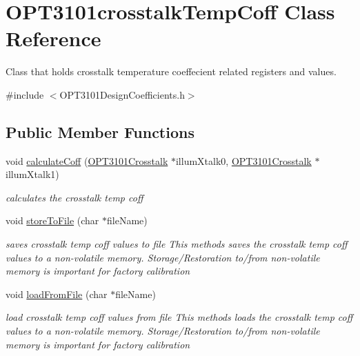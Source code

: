 \hypertarget{class_o_p_t3101crosstalk_temp_coff}{}\section{O\+P\+T3101crosstalk\+Temp\+Coff Class Reference}
\label{class_o_p_t3101crosstalk_temp_coff}


Class that holds crosstalk temperature coeffecient related registers and values.  




{\ttfamily \#include $<$O\+P\+T3101\+Design\+Coefficients.\+h$>$}

\subsection*{Public Member Functions}
\begin{DoxyCompactItemize}
\item 
void \mbox{\hyperlink{class_o_p_t3101crosstalk_temp_coff_a4a9926dea76c9744cd5bb4fd9b96fd52}{calculate\+Coff}} (\mbox{\hyperlink{class_o_p_t3101_crosstalk}{O\+P\+T3101\+Crosstalk}} $\ast$illum\+Xtalk0, \mbox{\hyperlink{class_o_p_t3101_crosstalk}{O\+P\+T3101\+Crosstalk}} $\ast$illum\+Xtalk1)
\begin{DoxyCompactList}\small\item\em calculates the crosstalk temp coff \end{DoxyCompactList}\item 
void \mbox{\hyperlink{class_o_p_t3101crosstalk_temp_coff_a8283a641699c42fe5232c2758ddfcd40}{store\+To\+File}} (char $\ast$file\+Name)
\begin{DoxyCompactList}\small\item\em saves crosstalk temp coff values to file This methods saves the crosstalk temp coff values to a non-\/volatile memory. Storage/\+Restoration to/from non-\/volatile memory is important for factory calibration \end{DoxyCompactList}\item 
void \mbox{\hyperlink{class_o_p_t3101crosstalk_temp_coff_a1335cf4cf57650284c93232d93c49ef0}{load\+From\+File}} (char $\ast$file\+Name)
\begin{DoxyCompactList}\small\item\em load crosstalk temp coff values from file This methods loads the crosstalk temp coff values to a non-\/volatile memory. Storage/\+Restoration to/from non-\/volatile memory is important for factory calibration \end{DoxyCompactList}\end{DoxyCompactItemize}

